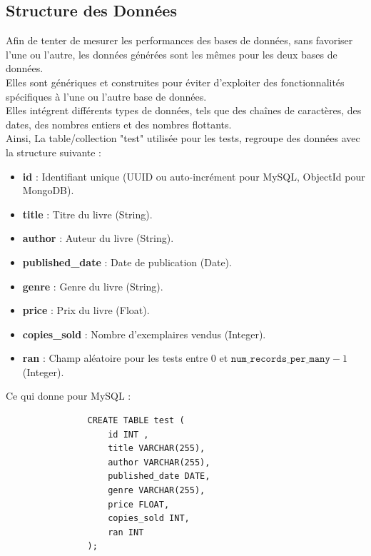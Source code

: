 \documentclass[12pt,a4paper]{report}
\begin{document}
    \subsection{Structure des Données}
        \begin{card} 
            Afin de tenter de mesurer les performances des bases de données, sans favoriser l'une ou l'autre, les données générées sont les mêmes pour les deux bases de données. \\
            Elles sont génériques et construites pour éviter d'exploiter des fonctionnalités spécifiques à l'une ou l'autre base de données. \\
            Elles intégrent différents types de données, tels que des chaînes de caractères, des dates, des nombres entiers et des nombres flottants. \\

            Ainsi, La table/collection "test" utilisée pour les tests, regroupe des données avec la structure suivante :
            \begin{itemize}
                \item \textbf{id} : Identifiant unique (UUID ou auto-incrément pour MySQL, ObjectId pour MongoDB).
                \item \textbf{title} : Titre du livre (String).
                \item \textbf{author} : Auteur du livre (String).
                \item \textbf{published\_date} : Date de publication (Date).
                \item \textbf{genre} : Genre du livre (String).
                \item \textbf{price} : Prix du livre (Float).
                \item \textbf{copies\_sold} : Nombre d'exemplaires vendus (Integer).
                \item \textbf{ran} : Champ aléatoire pour les tests entre 0 et $\texttt{num\_records\_per\_many} - 1$ (Integer).
            \end{itemize}
        
            Ce qui donne pour MySQL :
        
            \begin{verbatim}
                CREATE TABLE test (
                    id INT ,
                    title VARCHAR(255),
                    author VARCHAR(255),
                    published_date DATE,
                    genre VARCHAR(255),
                    price FLOAT,
                    copies_sold INT,
                    ran INT
                );
            \end{verbatim}
        \end{card}
\end{document}
